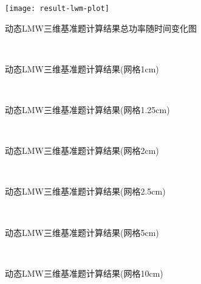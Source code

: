 \begin{figure}[H]
\centering
\texttt{[image: result-lwm-plot]}
\caption{动态LMW三维基准题计算结果总功率随时间变化图\label{fig:testresult.lwm.plot}}
\end{figure}

\begin{figure}[H]
\centering
{}
\\[1cm]
\caption{动态LMW三维基准题计算结果(网格1cm)\label{fig:testresult.lwm.1}}
\end{figure}

\begin{figure}[H]
\centering
{}
\\[1cm]
\caption{动态LMW三维基准题计算结果(网格1.25cm)\label{fig:testresult.lwm.125}}
\end{figure}


\begin{figure}[H]
\centering
{}
\\[1cm]
\caption{动态LMW三维基准题计算结果(网格2cm)\label{fig:testresult.lwm.2}}
\end{figure}


\begin{figure}[H]
\centering
{}
\\[1cm]
\caption{动态LMW三维基准题计算结果(网格2.5cm)\label{fig:testresult.lwm.25}}
\end{figure}


\begin{figure}[H]
\centering
{}
\\[1cm]
\caption{动态LMW三维基准题计算结果(网格5cm)\label{fig:testresult.lwm.5}}
\end{figure}


\begin{figure}[H]
\centering
{}
\\[1cm]
\caption{动态LMW三维基准题计算结果(网格10cm)\label{fig:testresult.lwm.10}}
\end{figure}

